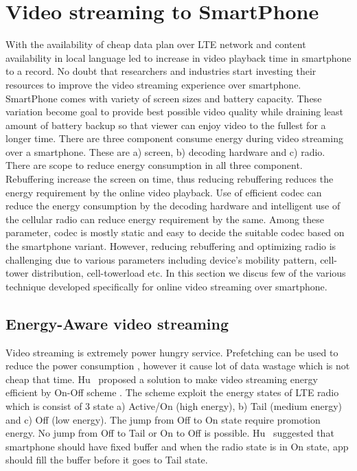 \section{Video streaming to SmartPhone}
With the availability of cheap data plan over LTE network and content availability in local language led to increase in video playback time in smartphone to a record. No doubt that researchers and industries start investing their resources to improve the video streaming experience over smartphone. SmartPhone comes with variety of screen sizes and battery capacity. These variation become goal to provide best possible video quality while draining least amount of battery backup so that viewer can enjoy video to the fullest for a longer time. There are three component consume energy during video streaming over a smartphone. These are a) screen, b) decoding hardware and c) radio. There are scope to reduce energy consumption in all three component. Rebuffering increase the screen on time, thus reducing rebuffering reduces the energy requirement by the online video playback. Use of efficient codec can reduce the energy consumption by the decoding hardware and intelligent use of the cellular radio can reduce energy requirement by the same. Among these parameter, codec is mostly static and easy to decide the suitable codec based on the smartphone variant. However, reducing rebuffering and optimizing radio is challenging due to various parameters including device's mobility pattern, cell-tower distribution, cell-towerload etc. In this section we discus few of the various technique developed specifically for online video streaming over smartphone.

\subsection{Energy-Aware video streaming}
Video streaming is extremely power hungry service. Prefetching can be used to reduce the power consumption \cite{6681586,10.1145/2079296.2079321}, however it cause lot of data wastage which is not cheap that time. Hu \etal\ proposed a solution to make video streaming energy efficient by On-Off scheme \cite{7218493}. The scheme exploit the energy states of LTE radio which is consist of 3 state a) Active/On (high energy), b) Tail (medium energy) and c) Off (low energy). The jump from Off to On state require promotion energy. No jump from Off to Tail or On to Off is possible. Hu \etal\ suggested that smartphone should have fixed buffer and when the radio state is in On state, app should fill the buffer before it goes to Tail state.

